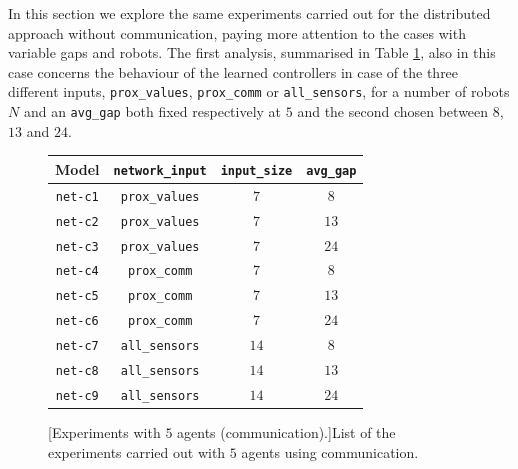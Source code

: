 In this section we explore the same experiments carried out for the distributed 
approach without communication, paying more attention to the cases with 
variable gaps and robots. 
The first analysis, summarised in Table \ref{tab:modeln5comm}, also in this case  
concerns the behaviour of the learned controllers in case of the three different 
inputs, \texttt{prox\_values}, \texttt{prox\_comm} or 
\texttt{all\_sensors}, for a number of robots $N$ and an \texttt{avg\_gap} both 
fixed respectively at $5$ and the second chosen between $8$, $13$ and $24$.
\begin{figure}[!htb]
	\centering
	\begin{tabular}{cccc}
		\toprule
		\textbf{Model} \quad & \textbf{\texttt{network\_input}} & 
		\textbf{\texttt{input\_size}} &
		\textbf{\texttt{avg\_gap}} \\
		\midrule
		\texttt{net-c1} 				 & \texttt{prox\_values}	&  $  7$  &  $  8$  \\
		\texttt{net-c2} 			 	 & \texttt{prox\_values}	&  $  7$  &  $13$ \\
		\texttt{net-c3} 				 & \texttt{prox\_values}	&  $  7$  &  $24$  \\
		\texttt{net-c4} 				 & \texttt{prox\_comm}	  &  $  7$  &  $  8$  \\
		\texttt{net-c5} 				 & \texttt{prox\_comm}	  &  $  7$  &  $13$  \\
		\texttt{net-c6} 				 & \texttt{prox\_comm}	  &  $  7$  &  $24$  \\
		\texttt{net-c7} 				 & \texttt{all\_sensors}	  &  $14$  &  $  8$  \\
		\texttt{net-c8} 				 & \texttt{all\_sensors}	  &  $14$  &  $13$ 	\\
		\texttt{net-c9} 				 & \texttt{all\_sensors}	  &  $14$  &  $24$ 	\\
		\bottomrule
	\end{tabular}
	[Experiments with $5$ agents (communication).]{List of the 
	experiments carried out with $5$ agents using communication.}
	\label{tab:modeln5comm}
\end{figure}

